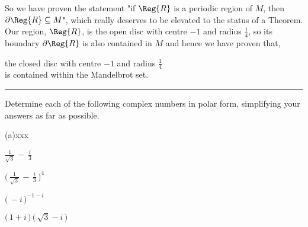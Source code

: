 \documentclass[english,a4paper,11pt]{scrartcl}
\begin{document}
\bigskip
So we have proven the statement "if $\Reg{R}$ is a periodic region of $M$, then $\partial\Reg{R} \subseteq M$", which really deserves to be elevated to the status of a Theorem.\\

\bigskip
Our region, $\Reg{R}$, is the open disc with centre $-1$ and radius $\displaystyle \frac1{4}$, so its boundary $\partial\Reg{R}$ is also contained in $M$ and hence we have proven that,\\

\bigskip
\begin{Answer}
\begin{center}
\qquad the closed disc with centre $-1$ and radius $\displaystyle \frac1{4}$ \qquad ~ \\
\bigskip
is contained within the Mandelbrot set.
\end{center}
\end{Answer}


\comment{===========================================================}
\noindent\rule[0.5ex]{\linewidth}{1pt} 
\newpage
\begin{Question}{}

Determine each of the following complex numbers in polar form, simplifying
your answers as far as possible.\\


\begin{labeling}{(a)xxx }
\item [(a)]  \quad \( \displaystyle  \frac1{\sqrt{3}} \,-\, \displaystyle \frac{i}{3}   \)

\item [(b)] \quad \( \displaystyle \Bigg(\, \frac1{\sqrt{3}} \,-\, \displaystyle \frac{i}{3} \,\Bigg)^4 \) 

\item [(c)]  \quad \( \displaystyle \big(\, -i \,\big)^{-1-i}  \)

\item [(d)]  \quad \( \displaystyle \big(\,1+i\,\big)\,\big(\, \sqrt{3}-i \,\big)  \)
  
\end{labeling}

\bigskip
\end{Question}

\setcounter{equation}{0}

\bigskip
\end{document}
